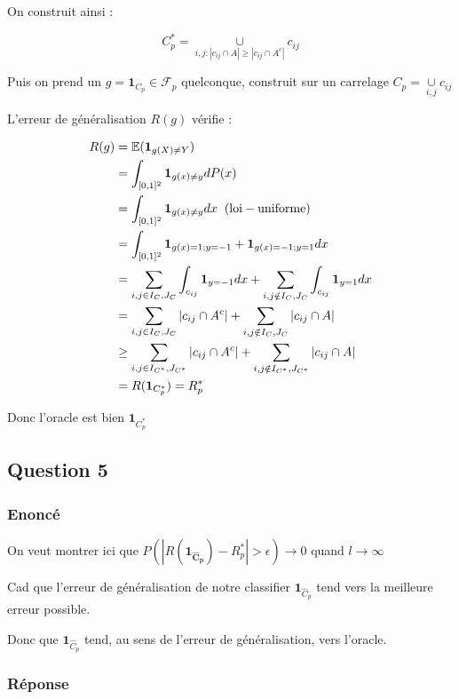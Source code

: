 \documentclass[french]{article}
\begin{document}
On construit ainsi :

\[
C^{*}_{p} = \underset{i,j : |c_{ij} \cap A| \geq |c_{ij} \cap A^{c}|}{\cup} c_{ij}
\]

Puis on prend un $g = \mathbf{1}_{C_{p}} \in \mathcal{F}_{p}$ quelconque, construit sur un carrelage $C_{p} = \underset{i,j}{\cup} c_{ij}$

L'erreur de généralisation $R(g)$ vérifie :

\begin{align}
R(g) &= \mathbb{E}(\mathbf{1}_{g(X)\neq Y}) \\
&= \int_{[0,1]^{2}} \mathbf{1}_{g(x) \neq y} dP(x) \\
&= \int_{[0,1]^{2}} \mathbf{1}_{g(x) \neq y} dx \hspace{2mm}\mathrm{(loi-uniforme)}\\ 
&= \int_{[0,1]^{2}} \mathbf{1}_{g(x)=1;y=-1} + \mathbf{1}_{g(x)=-1;y=1}dx \\
&= \sum_{i,j \in I_{C},J_{C}}\int_{c_{ij}}\mathbf{1}_{y=-1}dx +
\sum_{i,j \notin I_{C},J_{C}}\int_{c_{ij}}\mathbf{1}_{y=1}dx \\
&= \sum_{i,j \in I_{C},J_{C}} |c_{ij} \cap A^{c}| + 
\sum_{i,j \notin I_{C},J_{C}} |c_{ij} \cap A| \\
&\geq \sum_{i,j \in I_{C^{*}},J_{C^{*}}} |c_{ij} \cap A^{c}| + 
\sum_{i,j \notin I_{C^{*}},J_{C^{*}}} |c_{ij} \cap A| \\
&= R(\mathbf{1}_{C_{p}^{*}})=R^{*}_{p}
\end{align}

Donc l'oracle est bien $\mathbf{1}_{C^{*}_{p}}$

\subsection{Question 5}

\subsubsection{Enoncé}

On veut montrer ici que $P(|R(\mathbf{1_{\hat{C}_{p}}})-R_{p}^{*}|>\epsilon) \rightarrow 0 $ quand $ l \rightarrow \infty $

Cad que l'erreur de généralisation de notre classifier $\mathbf{1}_{\hat{C}_{p}}$ tend vers la meilleure erreur possible.

Donc que $\mathbf{1}_{\hat{C}_{p}}$ tend, au sens de l'erreur de généralisation, vers l'oracle.

\subsubsection{Réponse}
\end{document}
